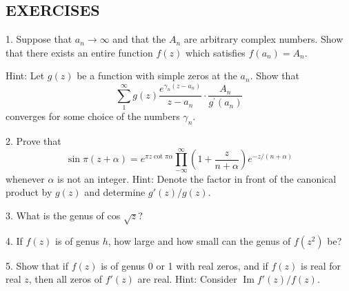 \subsection*{EXERCISES}
1. Suppose that $a_{n} \to \infty$ and that the $A_{n}$ are arbitrary complex numbers. Show that there exists an entire function $f(z)$ which satisfies $f(a_{n}) = A_{n}$.

Hint: Let $g(z)$ be a function with simple zeros at the $a_{n}$. Show that
\begin{equation*}
\sum_ {1} ^ {\infty} g (z) \frac {e ^ {\gamma_ {n} (z - a _ {n})}}{z - a _ {n}} \cdot \frac {A _ {n}}{g ^ {\prime} (a _ {n})}
\end{equation*}
converges for some choice of the numbers $\gamma_{n}$.

2. Prove that
\begin{equation*}
\sin \pi (z + \alpha) = e ^ {\pi z \cot \pi \alpha} \prod_ {- \infty} ^ {\infty} \left(1 + \frac {z}{n + \alpha}\right) e ^ {- z / (n + \alpha)}
\end{equation*}
whenever $\alpha$ is not an integer. Hint: Denote the factor in front of the canonical product by $g(z)$ and determine $g'(z)/g(z)$.

3. What is the genus of cos $\sqrt{z}$?

4. If $f(z)$ is of genus $h$, how large and how small can the genus of $f(z^2)$ be?

5. Show that if $f(z)$ is of genus 0 or 1 with real zeros, and if $f(z)$ is real for real $z$, then all zeros of $f'(z)$ are real. Hint: Consider $\operatorname{Im} f'(z) / f(z)$.

